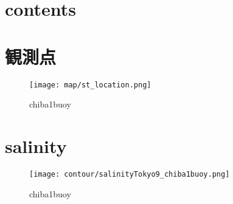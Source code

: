 \documentclass[12pt,a4paper]{jarticle}
\begin{document}
\section{contents}



\section{観測点}
\begin{figure}[hbtp]
  \texttt{[image: map/st\_location.png]}
  \caption{chiba1buoy}
  \label{地図}
\end{figure}

\section{salinity}
\begin{figure}[hbtp]
    \texttt{[image: contour/salinityTokyo9\_chiba1buoy.png]}
    \caption{chiba1buoy}
\end{figure}
\end{document}
